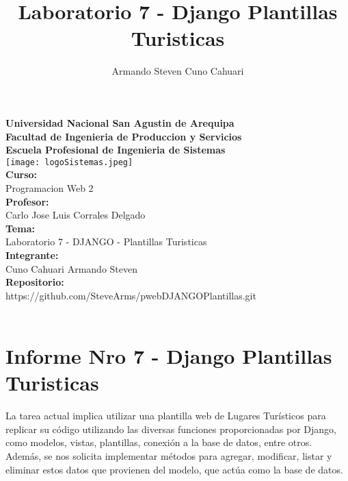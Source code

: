 \documentclass[10pt, a4paper]{article}
\title{Laboratorio 7 - Django Plantillas Turisticas}
\author{Armando Steven Cuno Cahuari}
\newcommand{\integrante}{\fontsize{13}{14}\selectfont Cuno Cahuari Armando Steven}
\newcommand{\curso}{ \fontsize{13}{14}\selectfont Programacion Web 2}
\newcommand{\tema}{\fontsize{13}{14}\selectfont Laboratorio 7 - DJANGO - Plantillas Turisticas}
\newcommand{\repositorio}{\fontsize{13}{14}\selectfont https://github.com/SteveArms/pwebDJANGOPlantillas.git}
\newcommand{\profesor}{Carlo Jose Luis Corrales Delgado}
\begin{document}
\begin{titlepage}
	\centering
	\textbf{\fontsize{20}{19}\selectfont Universidad Nacional San Agustin de Arequipa} \\
	\vspace{1em}
	\textbf{\fontsize{15}{16}\selectfont Facultad de Ingenieria de Produccion y Servicios} \\ 
	\vspace{1em}
	\textbf{\fontsize{15}{16}\selectfont Escuela Profesional de Ingenieria de Sistemas} \\
	\vspace{1cm}
	\texttt{[image: logoSistemas.jpeg]} \\
	\vspace{1cm}
	\textbf{\fontsize{13}{14}\selectfont Curso: } \\ \vspace{1em}
	\curso \\ \vspace{1em}
	\textbf{\fontsize{13}{14}\selectfont Profesor:} \\ \vspace{1em}
	\profesor \\ \vspace{1em}
	\textbf{\fontsize{13}{14}\selectfont Tema: } \\ \vspace{1em}
	\tema \\ \vspace{1em}
	\textbf{\fontsize{13}{14}\selectfont Integrante: } \\ \vspace{1em}
	\integrante \\ \vspace{1em}
	\textbf{\fontsize{13}{14}\selectfont Repositorio:} \\ \vspace{1em}
	\repositorio \\ \vspace{5em}
	\textbf{\fontsize{20}{14}} \\ \vspace{5em}
\end{titlepage}
\section*{\centering Informe Nro 7 - Django Plantillas Turisticas}
	\begin{flushleft}
		La tarea actual implica utilizar una plantilla web de Lugares Turísticos para replicar su código utilizando las diversas funciones proporcionadas por Django, como modelos, vistas, plantillas, conexión a la base de datos, entre otros. Además, se nos solicita implementar métodos para agregar, modificar, listar y eliminar estos datos que provienen del modelo, que actúa como la base de datos.
	\end{flushleft}
\end{document}
